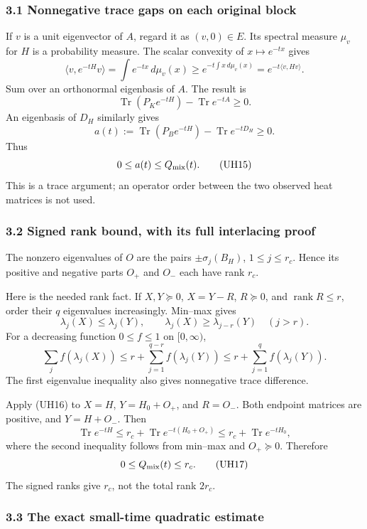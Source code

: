 \documentclass[11pt]{article}
\begin{document}
\subsubsection{3.1 Nonnegative trace gaps on each original block}\label{nonnegative-trace-gaps-on-each-original-block}

If \(v\) is a unit eigenvector of \(A\), regard it as \((v,0)\in E\). Its spectral measure \(\mu_v\) for \(H\) is a probability measure. The scalar convexity of \(x\mapsto e^{-tx}\) gives \[
 \langle v,e^{-tH}v\rangle
 =\int e^{-tx}\,d\mu_v(x)
 \ge e^{-t\int x\,d\mu_v(x)}
 =e^{-t\langle v,Hv\rangle}.
\] Sum over an orthonormal eigenbasis of \(A\). The result is \[
 \operatorname{Tr}(P_Ke^{-tH})-\operatorname{Tr}e^{-tA}\ge0.
\] An eigenbasis of \(D_H\) similarly gives \[
 a(t):=\operatorname{Tr}(P_Be^{-tH})-\operatorname{Tr}e^{-tD_H}\ge0.
\] Thus \[
 0\le a(t)\le Q_{\rm mix}(t).
 \tag{UH15}
\] This is a trace argument; an operator order between the two observed heat matrices is not used.

\subsubsection{3.2 Signed rank bound, with its full interlacing proof}\label{signed-rank-bound-with-its-full-interlacing-proof}

The nonzero eigenvalues of \(O\) are the pairs \(\pm\sigma_j(B_H)\), \(1\le j\le r_c\). Hence its positive and negative parts \(O_+\) and \(O_-\) each have rank \(r_c\).

Here is the needed rank fact. If \(X,Y\succeq0\), \(X=Y-R\), \(R\succeq0\), and \(\operatorname{rank}R\le r\), order their \(q\) eigenvalues increasingly. Min--max gives \[
 \lambda_j(X)\le\lambda_j(Y),\qquad
 \lambda_j(X)\ge\lambda_{j-r}(Y)\quad(j>r).
\] For a decreasing function \(0\le f\le1\) on \([0,\infty)\), \[
 \sum_jf(\lambda_j(X))
 \le r+\sum_{j=1}^{q-r}f(\lambda_j(Y))
 \le r+\sum_{j=1}^qf(\lambda_j(Y)).
 \tag{UH16}
\] The first eigenvalue inequality also gives nonnegative trace difference.

Apply (UH16) to \(X=H\), \(Y=H_0+O_+\), and \(R=O_-\). Both endpoint matrices are positive, and \(Y=H+O_-\). Then \[
 \operatorname{Tr}e^{-tH}
 \le r_c+\operatorname{Tr}e^{-t(H_0+O_+)}
 \le r_c+\operatorname{Tr}e^{-tH_0},
\] where the second inequality follows from min--max and \(O_+\succeq0\). Therefore \[
 0\le Q_{\rm mix}(t)\le r_c.
 \tag{UH17}
\] The signed ranks give \(r_c\), not the total rank \(2r_c\).

\subsubsection{3.3 The exact small-time quadratic estimate}\label{the-exact-small-time-quadratic-estimate}
\end{document}
